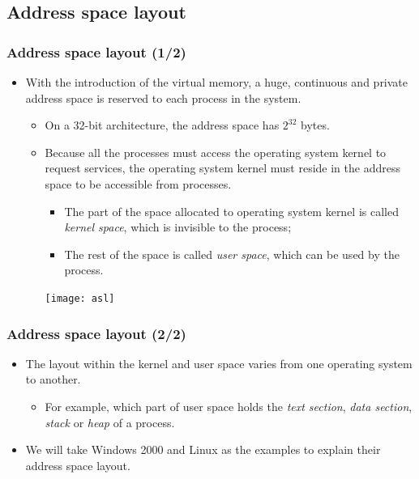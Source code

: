 \documentclass[CJKutf8,xcolor=pdftex,dvipsnames,table]{beamer}
\begin{document}
\begin{CJK*}{UTF8}{song}
  \subsection{Address space layout}

  \begin{frame}
    \frametitle{Address space layout (1/2)} \pause
    \begin{itemize}
    \item{With the introduction of the virtual memory, a huge, continuous and private address space is reserved to each process in the system.} \pause
      \begin{itemize}
      \item{On a 32-bit architecture, the address space has $2^{32}$ bytes.} \pause
      \item{Because all the processes must access the operating system kernel to request services, the operating system kernel must reside in the address space to be accessible from processes.} \pause
        \begin{minipage}[c]{0.5\textwidth}
          \begin{itemize}
          \item{The part of the space allocated to operating system kernel is called \emph{kernel space}, which is invisible to the process;} \pause
          \item{The rest of the space is called \emph{user space}, which can be used by the process.} \pause
          \end{itemize}
        \end{minipage}%
        \begin{minipage}[c]{0.5\textwidth}
          \begin{center}
            \texttt{[image: asl]}
          \end{center}
        \end{minipage}
      \end{itemize}
    \end{itemize}
  \end{frame}

  
  \begin{frame}
    \frametitle{Address space layout (2/2)} \pause
    \begin{itemize}
    \item{The layout within the kernel and user space varies from one operating system to another.} \pause
      \begin{itemize}
      \item{For example, which part of user space holds the \emph{text section}, \emph{data section}, \emph{stack} or \emph{heap} of a process.} \pause
      \end{itemize}
    \item{We will take Windows 2000 and Linux as the examples to explain their address space layout.}
    \end{itemize}
  \end{frame}
  

\end{CJK*}
\end{document}
